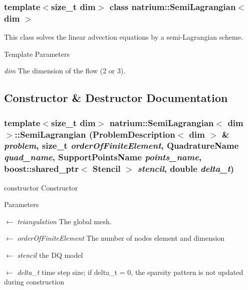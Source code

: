 \subsubsection*{template$<$size\_\-t dim$>$ class natrium::SemiLagrangian$<$ dim $>$}

This class solves the linear advection equations by a semi-\/Lagrangian scheme. 
\begin{DoxyTemplParams}{Template Parameters}
\item[{\em dim}]The dimension of the flow (2 or 3). \end{DoxyTemplParams}


\subsection{Constructor \& Destructor Documentation}
\hypertarget{classnatrium_1_1SemiLagrangian_a6875a404457277b3e1f7853768837b3f}{
\subsubsection[{SemiLagrangian}]{\setlength{\rightskip}{0pt plus 5cm}template$<$size\_\-t dim$>$ {\bf natrium::SemiLagrangian}$<$ dim $>$::{\bf SemiLagrangian} ({\bf ProblemDescription}$<$ dim $>$ \& {\em problem}, \/  size\_\-t {\em orderOfFiniteElement}, \/  QuadratureName {\em quad\_\-name}, \/  SupportPointsName {\em points\_\-name}, \/  boost::shared\_\-ptr$<$ {\bf Stencil} $>$ {\em stencil}, \/  double {\em delta\_\-t})}}
\label{classnatrium_1_1SemiLagrangian_a6875a404457277b3e1f7853768837b3f}


constructor Constructor 
\begin{DoxyParams}{Parameters}
\item[\mbox{$\leftarrow$} {\em triangulation}]The global mesh. \item[\mbox{$\leftarrow$} {\em orderOfFiniteElement}]The number of nodes element and dimension \item[\mbox{$\leftarrow$} {\em stencil}]the DQ model \item[\mbox{$\leftarrow$} {\em delta\_\-t}]time step size; if delta\_\-t = 0, the sparsity pattern is not updated during construction \end{DoxyParams}


